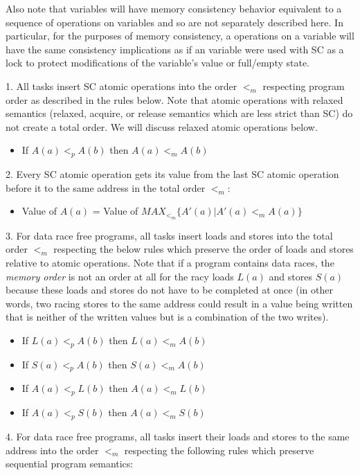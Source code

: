 Also note that  variables will have memory consistency behavior
equivalent to a sequence of operations on  variables and so are
not separately described here. In particular, for the purposes of memory
consistency, a operations on a  variable will have the same
consistency implications as if an  variable were used with
SC as a lock to protect modifications of the 
variable's value or full/empty state.


1. All tasks insert SC atomic operations into the order $<_m$ respecting
program order as described in the rules below. Note that atomic operations with
relaxed semantics (relaxed, acquire, or release semantics which are less strict
than SC) do not create a total order. We will discuss relaxed atomic operations
below.

\begin{itemize}
  \item If $A(a)<_pA(b)$ then $A(a)<_mA(b)$
\end{itemize}

2. Every SC atomic operation gets its value from the last SC atomic operation before it to the same address in the total order $<_m$:
\begin{itemize}
  \item Value of $A(a)$ = Value of $MAX_{<_m} \{A'(a)|A'(a) <_m A(a) \}$
\end{itemize}

3. For data race free programs, all tasks insert loads and stores into the
total order $<_m$ respecting the below rules which preserve the order of loads
and stores relative to atomic operations.  Note that if a program contains data
races, the \textit{memory order} is not an order at all for the racy loads
$L(a)$ and stores $S(a)$ because these loads and stores do not have to be
completed at once (in other words, two racing stores to the same address could
result in a value being written that is neither of the written values but is a
combination of the two writes). 
\begin{itemize}
  \item If $L(a)<_pA(b)$ then $L(a)<_mA(b)$
  \item If $S(a)<_pA(b)$ then $S(a)<_mA(b)$
  \item If $A(a)<_pL(b)$ then $A(a)<_mL(b)$
  \item If $A(a)<_pS(b)$ then $A(a)<_mS(b)$
\end{itemize}

4. For data race free programs, all tasks insert their loads and stores to the
same address into the order $<_m$ respecting the following rules which preserve
sequential program semantics:

